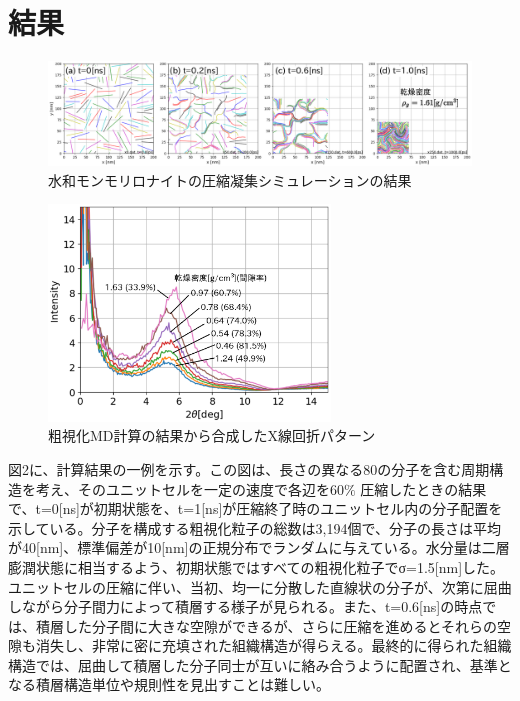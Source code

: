 ﻿\documentclass[11pt,a4j]{jarticle}
\begin{document}
\section{結果}
\begin{figure}[h]
	\begin{center}
	\includegraphics[width=1.0\linewidth]{Figs/revs.eps} 
	\end{center}
	\caption{水和モンモリロナイトの圧縮凝集シミュレーションの結果} 
	\label{fig:fig2}
\end{figure}
\begin{figure}
	\centering
	\includegraphics[keepaspectratio,width=75mm]{Figs/xrd.eps}
	\caption{粗視化MD計算の結果から合成したX線回折パターン}
	\label{fig:fig3}
\end{figure}
図2に、計算結果の一例を示す。この図は、長さの異なる80の分子を含む周期構造を考え、そのユニットセルを一定の速度で各辺を60$\%$
圧縮したときの結果で、t=0[ns]が初期状態を、t=1[ns]が圧縮終了時のユニットセル内の分子配置を示している。分子を構成する粗視化粒子の総数は3,194個で、分子の長さは平均が40[nm]、標準偏差が10[nm]の正規分布でランダムに与えている。水分量は二層膨潤状態に相当するよう、初期状態ではすべての粗視化粒子でσ=1.5[nm]した。ユニットセルの圧縮に伴い、当初、均一に分散した直線状の分子が、次第に屈曲しながら分子間力によって積層する様子が見られる。また、t=0.6[ns]の時点では、積層した分子間に大きな空隙ができるが、さらに圧縮を進めるとそれらの空隙も消失し、非常に密に充填された組織構造が得らえる。最終的に得られた組織構造では、屈曲して積層した分子同士が互いに絡み合うように配置され、基準となる積層構造単位や規則性を見出すことは難しい。
\end{document}
